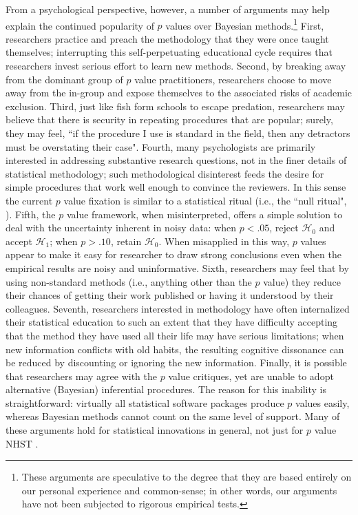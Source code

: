 From a psychological perspective, however, a number of arguments may help explain the continued popularity of $p$ values over Bayesian methods.\footnote{These arguments are speculative to the degree that they are based entirely on our personal experience and common-sense; in other words, our arguments have not been subjected to rigorous empirical tests.} First, researchers practice and preach the methodology that they were once taught themselves; interrupting this self-perpetuating educational cycle requires that researchers invest serious effort to learn new methods. Second, by breaking away from the dominant group of $p$ value practitioners, researchers choose to move away from the in-group and expose themselves to the associated risks of academic exclusion. Third, just like fish form schools to escape predation, researchers may believe that there is security in repeating procedures that are popular; surely, they may feel, ``if the procedure I use is standard in the field, then any detractors must be overstating their case". Fourth, many psychologists are primarily interested in addressing substantive research questions, not in the finer details of statistical methodology; such methodological disinterest feeds the desire for simple procedures that work well enough to convince the reviewers. In this sense the current $p$ value fixation is similar to a statistical ritual (i.e., the ``null ritual", ). Fifth, the $p$ value framework, when misinterpreted, offers a simple solution to deal with the uncertainty inherent in noisy data: when $p<.05$, reject $\mathcal{H}_0$ and accept $\mathcal{H}_1$; when $p>.10$, retain $\mathcal{H}_0$. When misapplied in this way, $p$ values appear to make it easy for researcher to draw strong conclusions even when the empirical results are noisy and uninformative. Sixth, researchers may feel that by using non-standard methods (i.e., anything other than the $p$ value) they reduce their chances of getting their work published or having it understood by their colleagues. Seventh, researchers interested in methodology have often internalized their statistical education to such an extent that they have difficulty accepting that the method they have used all their life may have serious limitations; when new information conflicts with old habits, the resulting cognitive dissonance can be reduced by discounting or ignoring the new information. Finally, it is possible that researchers may agree with the $p$ value critiques, yet are unable to adopt alternative (Bayesian) inferential procedures. The reason for this inability is straightforward: virtually all statistical software packages produce $p$ values easily, whereas Bayesian methods cannot count on the same level of support. Many of these arguments hold for statistical innovations in general, not just for $p$ value NHST \cite{Sharpe2013}.


